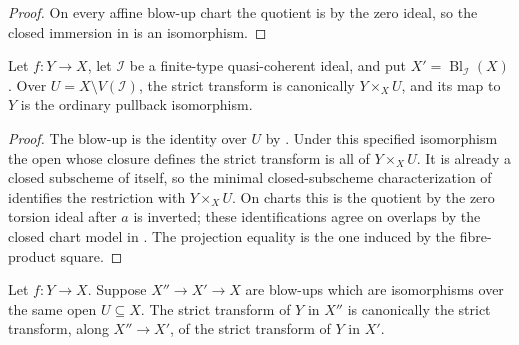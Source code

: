 \begin{proof}
  On every affine blow-up chart the quotient is by the zero ideal, so the
  closed immersion in
   is an isomorphism.
\end{proof}

\begin{lemma}
  \label{lemma:nagata-strict-transform-over-complement}
  \leanok

  Let $f\colon Y\to X$, let $\mathcal I$ be a finite-type quasi-coherent
  ideal, and put $X'=\operatorname{Bl}_{\mathcal I}(X)$.  Over
  $U=X\setminus V(\mathcal I)$, the strict transform is canonically
  $Y\times_XU$, and its map to $Y$ is the ordinary pullback isomorphism.
\end{lemma}

\begin{proof}
  \leanok
  The blow-up is the identity over $U$ by
  .  Under this specified
  isomorphism the open whose closure defines the strict transform is all of
  $Y\times_XU$.  It is already a closed subscheme of itself, so the minimal
  closed-subscheme characterization of
   identifies
  the restriction with $Y\times_XU$.  On charts this is the quotient by the
  zero torsion ideal after $a$ is inverted; these identifications agree on
  overlaps by the closed chart model in
  .  The projection
  equality is the one induced by the fibre-product square.
\end{proof}

\begin{lemma}
  \label{lemma:nagata-strict-transform-dominating}

  Let $f\colon Y\to X$.  Suppose $X''\to X'\to X$ are blow-ups which are
  isomorphisms over the same open $U\subseteq X$.  The strict transform of
  $Y$ in $X''$ is canonically the strict
  transform, along $X''\to X'$, of the strict transform of $Y$ in $X'$.
\end{lemma}

